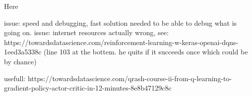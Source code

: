 Here 

issue: speed and debugging, fast solution needed to be able to debug what is going on. 
issue: internet resources actually wrong, see: https://towardsdatascience.com/reinforcement-learning-w-keras-openai-dqns-1eed3a5338c (line 103 at the bottem. he quits if it succeeds once which could be by chance)


usefull: https://towardsdatascience.com/qrash-course-ii-from-q-learning-to-gradient-policy-actor-critic-in-12-minutes-8e8b47129c8c